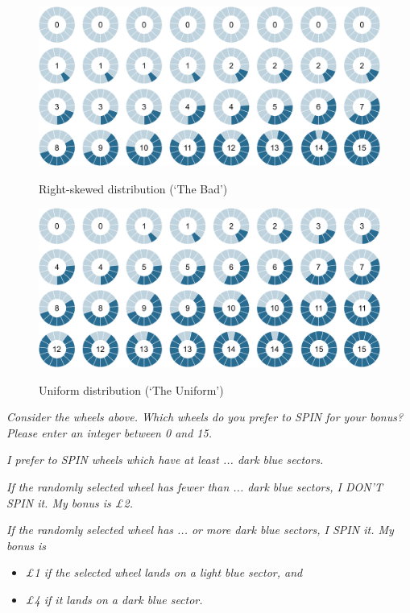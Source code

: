 \begin{figure}[h!]
  \centering
 {\includegraphics[width=0.95\linewidth]{Right_15.png}}
  \caption{Right-skewed distribution (`The Bad')}
  \label{fig:thebad}
\end{figure}


\begin{figure}[h!]
  \centering
 {\includegraphics[width=0.95\linewidth]{Uniform_15.png}}
  \caption{Uniform distribution (`The Uniform')}
  \label{fig:theuniform}
\end{figure}

\textit{Consider the wheels above. Which wheels do you prefer to SPIN for your bonus?
Please enter an integer between 0 and 15.}

\textit{I prefer to SPIN wheels which have at least ... dark blue sectors.}

\textit{If the randomly selected wheel has fewer than ... dark blue sectors, I DON'T SPIN it.
My bonus is \pounds2.}

\textit{If the randomly selected wheel has ... or more dark blue sectors, I SPIN it.
My bonus is}
\begin{itemize}
\item \textit{\pounds1 if the selected wheel lands on a light blue sector, and}
\item \textit{\pounds4 if it lands on a dark blue sector.}
\end{itemize}

